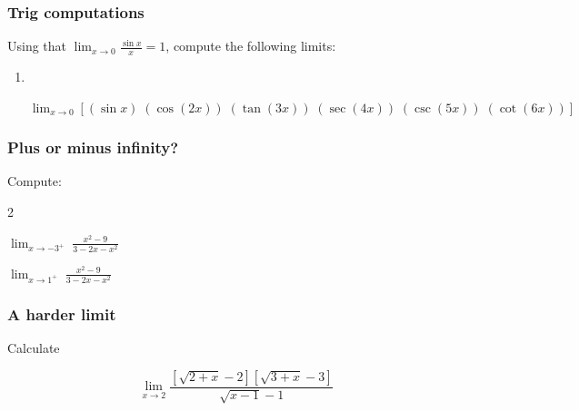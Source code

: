 \documentclass[14pt]{beamer}
\begin{document}
\begin{frame}
	\frametitle{Trig computations}

	Using that $\displaystyle \lim_{x \to 0}\frac{\sin x}{x}= 1$, compute the following
	limits:

	\begin{enumerate}

		\item \
			\vspace{-.6cm}

			{\fontsize{13}{13}\selectfont $\displaystyle \lim_{x \to 0}\left[ (\sin x) \; (\cos (2x)) \; (\tan (3x)) \; (\sec (4x) ) \; (\csc (5x)) \; (\cot (6x)) \right]$ }
	\end{enumerate}
\end{frame}

\begin{frame}
	\frametitle{Plus or minus infinity?}

	Compute:
	\begin{enumerate}
	\end{enumerate}
\end{frame}

\begin{frame}
	\frametitle{A harder limit}

	Calculate

	\[
		\lim_{x \to 2}\frac{\left[\sqrt{2+x} -2\right] \left[ \sqrt{3+x} - 3 \right]}{\sqrt{x-1}
		- 1}
	\]
\end{frame}
\end{document}
